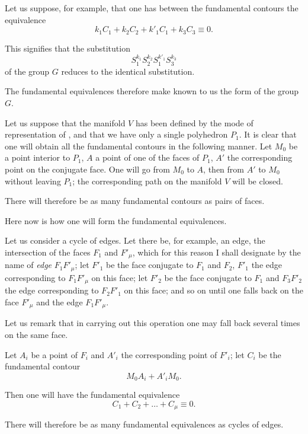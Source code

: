 \documentclass{article}
\begin{document}
Let us suppose, for example, that one has between the fundamental contours the equivalence
\[ k_{1}C_{1} + k_{2}C_{2} + k'_{1}C_{1} + k_{3}C_{3} \equiv 0. \]

This signifies that the substitution
\[ S^{k_{1}}_{1}S^{k_{2}}_{2}S^{k'_{1}}_{1}S^{k_{3}}_{3} \]
of the group $G$ reduces to the identical substitution.

The fundamental equivalences therefore make known to us the form of the group $G$.

Let us suppose that the manifold $V$ has been defined by the mode of representation of , and that we have only a single polyhedron $P_{1}$. It is clear that one will obtain all the fundamental contours in the following manner. Let $M_{0}$ be a point interior to $P_{1}$, $A$ a point of one of the faces of $P_{1}$, $A'$ the corresponding point on the conjugate face. One will go from $M_{0}$ to $A$, then from $A'$ to $M_{0}$ without leaving $P_{1}$; the corresponding path on the manifold $V$ will be closed.

There will therefore be as many fundamental contours as pairs of faces.

Here now is how one will form the fundamental equivalences.

Let us consider a cycle of edges. Let there be, for example, an edge, the intersection of the faces $F_{1}$ and $F'_{\mu}$, which for this reason I shall designate by the name of \emph{edge} $F_{1}F'_{\mu}$; let $F'_{1}$ be the face conjugate to $F_{1}$ and $F_{2}$, $F'_{1}$ the edge corresponding to $F_{1}F'_{\mu}$ on this face; let $F'_{2}$ be the face conjugate to $F_{1}$ and $F_{3}F'_{2}$ the edge corresponding to $F_{2}F'_{1}$ on this face; and so on until one falls back on the face $F'_{\mu}$ and the edge $F_{1}F'_{\mu}$.

Let us remark that in carrying out this operation one may fall back several times on the same face.

Let $A_{i}$ be a point of $F_{i}$ and $A'_{i}$ the corresponding point of $F'_{i}$; let $C_{i}$ be the fundamental contour
\[ M_{0}A_{i} + A'_{i}M_{0}. \]

Then one will have the fundamental equivalence
\[ C_{1} + C_{2} + \ldots + C_{\mu} \equiv 0. \]

There will therefore be as many fundamental equivalences as cycles of edges.
\end{document}
